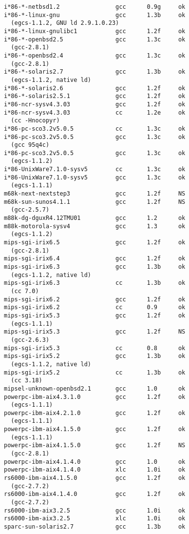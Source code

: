 \begin{Verbatim}[frame=single]
i*86-*-netbsd1.2                gcc      0.9g     ok
i*86-*-linux-gnu                gcc      1.3b     ok
  (egcs-1.1.2, GNU ld 2.9.1.0.23)
i*86-*-linux-gnulibc1           gcc      1.2f     ok
i*86-*-openbsd2.5               gcc      1.3c     ok
  (gcc-2.8.1)
i*86-*-openbsd2.4               gcc      1.3c     ok
  (gcc-2.8.1)
i*86-*-solaris2.7               gcc      1.3b     ok
  (egcs-1.1.2, native ld)
i*86-*-solaris2.6               gcc      1.2f     ok
i*86-*-solaris2.5.1             gcc      1.2f     ok
i*86-ncr-sysv4.3.03             gcc      1.2f     ok
i*86-ncr-sysv4.3.03             cc       1.2e     ok
  (cc -Hnocopyr)
i*86-pc-sco3.2v5.0.5            cc       1.3c     ok
i*86-pc-sco3.2v5.0.5            gcc      1.3c     ok
  (gcc 95q4c)
i*86-pc-sco3.2v5.0.5            gcc      1.3c     ok
  (egcs-1.1.2)
i*86-UnixWare7.1.0-sysv5        cc       1.3c     ok
i*86-UnixWare7.1.0-sysv5        gcc      1.3c     ok
  (egcs-1.1.1)
m68k-next-nextstep3             gcc      1.2f     NS
m68k-sun-sunos4.1.1             gcc      1.2f     NS
  (gcc-2.5.7)
m88k-dg-dguxR4.12TMU01          gcc      1.2      ok
m88k-motorola-sysv4             gcc      1.3      ok
  (egcs-1.1.2)
mips-sgi-irix6.5                gcc      1.2f     ok
  (gcc-2.8.1)
mips-sgi-irix6.4                gcc      1.2f     ok
mips-sgi-irix6.3                gcc      1.3b     ok
  (egcs-1.1.2, native ld)
mips-sgi-irix6.3                cc       1.3b     ok
  (cc 7.0)
mips-sgi-irix6.2                gcc      1.2f     ok
mips-sgi-irix6.2                cc       0.9      ok
mips-sgi-irix5.3                gcc      1.2f     ok
  (egcs-1.1.1)
mips-sgi-irix5.3                gcc      1.2f     NS
  (gcc-2.6.3)
mips-sgi-irix5.3                cc       0.8      ok
mips-sgi-irix5.2                gcc      1.3b     ok
  (egcs-1.1.2, native ld)
mips-sgi-irix5.2                cc       1.3b     ok
  (cc 3.18)
mipsel-unknown-openbsd2.1       gcc      1.0      ok
powerpc-ibm-aix4.3.1.0          gcc      1.2f     ok
  (egcs-1.1.1)
powerpc-ibm-aix4.2.1.0          gcc      1.2f     ok
  (egcs-1.1.1)
powerpc-ibm-aix4.1.5.0          gcc      1.2f     ok
  (egcs-1.1.1)
powerpc-ibm-aix4.1.5.0          gcc      1.2f     NS
  (gcc-2.8.1)
powerpc-ibm-aix4.1.4.0          gcc      1.0      ok
powerpc-ibm-aix4.1.4.0          xlc      1.0i     ok
rs6000-ibm-aix4.1.5.0           gcc      1.2f     ok
  (gcc-2.7.2)
rs6000-ibm-aix4.1.4.0           gcc      1.2f     ok
  (gcc-2.7.2)
rs6000-ibm-aix3.2.5             gcc      1.0i     ok
rs6000-ibm-aix3.2.5             xlc      1.0i     ok
sparc-sun-solaris2.7            gcc      1.3b     ok

\end{Verbatim}

